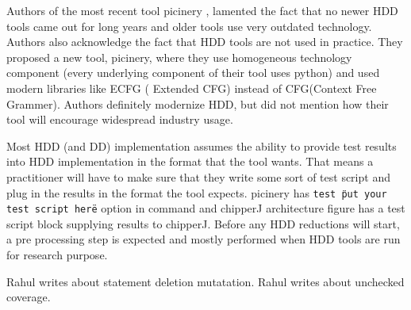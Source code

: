 Authors of the most recent tool picinery  \cite{pricieley}, lamented the fact that no newer HDD tools came out for long years and older tools use very outdated technology. Authors also acknowledge the fact that HDD tools are not used in practice. They proposed a new tool, picinery, where they use homogeneous technology component (every underlying component of their tool uses python) and used modern libraries like ECFG ( Extended CFG) instead of CFG(Context Free Grammer). Authors definitely modernize HDD, but did not mention how their tool will encourage widespread industry usage. 


Most HDD (and DD) implementation assumes the ability to provide test results into HDD implementation in the format that the tool wants. That means a practitioner will have to make sure that they write some sort of test script and plug in the results in the format the tool expects. picinery has \texttt{test \"put your test script here\"} option in command and chipperJ architecture figure has a test script block supplying results to chipperJ.  Before any HDD reductions will start, a pre processing step is expected and mostly performed when HDD tools are run for research purpose. 

Rahul writes about statement deletion mutatation. 
Rahul writes about unchecked coverage.
 
%
 

    

   

